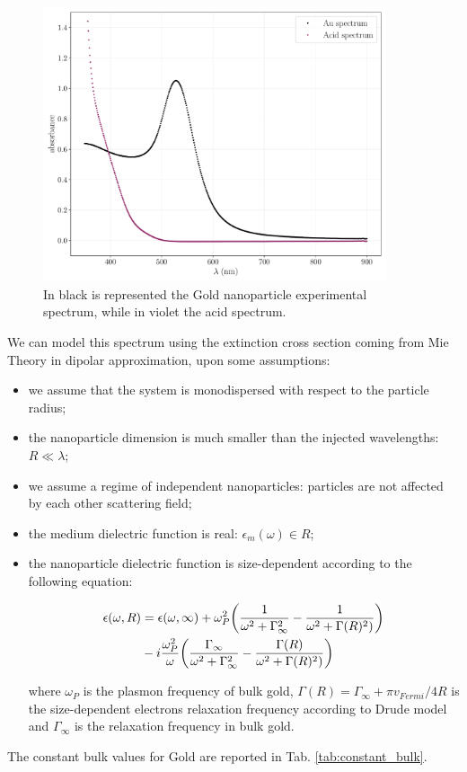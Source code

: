 \documentclass[prb,twocolumn]{revtex4-1}
\begin{document}
\begin{figure}[!t]
    \begin{minipage}[l]{1.0\columnwidth}
    \centering
    \includegraphics[width=0.9\textwidth]{images/os/exp_data.pdf}
    \caption{In black is represented the Gold nanoparticle experimental spectrum, while in violet the acid spectrum.}
    \label{fig:exp_spectra}
    \end{minipage}
\end{figure}
We can model this spectrum using the extinction cross section coming from Mie Theory in dipolar approximation, upon some assumptions:
\begin{itemize}
    \item we assume that the system is monodispersed with respect to the particle radius;
    \item the nanoparticle dimension is much smaller than the injected wavelengths: $R \ll \lambda$;
    \item we assume a regime of independent nanoparticles: particles are not affected by each other scattering field;
    \item the medium dielectric function is real: $\epsilon_m(\omega) \in R$;
    \item the nanoparticle dielectric function is size-dependent according to the following equation:
    \begin{small}
    \begin{equation}
    \begin{split}
       \epsilon(\omega,R) & = \epsilon(\omega,\infty) + \omega_P^2 \qty(\frac{1}{\omega^2+\Gamma_{\infty}^2}-\frac{1}{\omega^2+ \Gamma(R)^2)}) \\ 
     & -i\frac{\omega_P^2}{\omega} \qty(\frac{\Gamma_{\infty}}{\omega^2+\Gamma_{\infty}^2}-\frac{\Gamma(R)}{\omega^2+ \Gamma(R)^2)})
      \end{split} 
    \end{equation}
    \end{small}
    \noindent where $\omega_P$ is the plasmon frequency of bulk gold, $\Gamma(R) = \Gamma_{\infty} + \pi v_{Fermi}/4R$ is the size-dependent electrons relaxation frequency according to Drude model and $\Gamma_{\infty}$ is the relaxation frequency in bulk gold.
\end{itemize}
 The constant bulk values for Gold are reported in Tab. \ref{tab:constant_bulk}.
 
\end{document}
